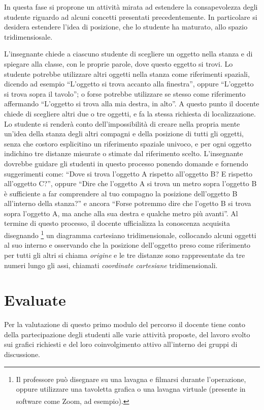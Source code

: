 \documentclass{report} \usepackage[T1]{fontenc} \usepackage[italian]{babel}
\begin{document}
In questa fase si proprone un attività mirata ad estendere la consapevolezza
degli studente riguardo ad alcuni concetti presentati precedentemente.
In particolare si desidera estendere l'idea di posizione, che lo studente ha maturato,
allo spazio tridimensiosale.

L'insegnante chiede a ciascuno studente di scegliere un oggetto nella stanza e di
spiegare alla classe, con le proprie parole, dove questo eggetto si trovi.
Lo studente potrebbe utilizzare altri oggetti nella stanza come riferimenti spaziali,
dicendo ad esempio ``L'oggetto si trova accanto alla finestra'', oppure
``L'oggetto si trova sopra il tavolo''; o forse potrebbe utilizzare se stesso come
riferimento affermando ``L'oggetto si trova alla mia destra, in alto''.
A questo punto il docente chiede di scegliere altri due o tre oggetti,
e fa la stessa richiesta di localizzazione. Lo studente si renderà
conto dell'impossibilità di creare nella propria mente un'idea della stanza
degli altri compagni e della posizione di tutti gli oggetti, senza che
costoro esplicitino un riferimento spaziale univoco, e per ogni oggetto indichino tre distanze
misurate o stimate dal riferimento scelto.
L'insegnante dovrebbe guidare gli studenti in questo processo ponendo domande e fornendo suggerimenti
come: ``Dove si trova l'oggetto A rispetto all'oggetto B? E rispetto all'oggetto C?'',
oppure ``Dire che l'oggetto A si trova un metro sopra l'oggetto B è sufficiente
a far comprendere al tuo compagno la posizione dell'oggetto B all'interno della stanza?''
e ancora ``Forse potremmo dire che l'ogetto B si trova sopra l'oggetto A, ma anche alla sua destra
e qualche metro più avanti''.
Al termine di questo processo, il docente ufficializza la conoscenza acquisita disegnando
\footnote{
Il professore può disegnare su una lavagna e filmarsi durante l'operazione, oppure
utilizzare una tavoletta grafica o una lavagna virtuale (presente in software
come Zoom\textsuperscript{\textregistered}, ad esempio).
}
un diagramma cartesiano tridimensionale, collocando alcuni oggetti al suo interno
e osservando che la posizione dell'oggetto preso come riferimento per tutti gli altri
si chiama \emph{origine} e le tre distanze sono rappresentate da tre numeri lungo
gli assi, chiamati \emph{coordinate cartesiane} tridimensionali.

\section{Evaluate}
Per la valutazione di questo primo modulo del percorso il docente tiene conto della
partecipazione degli studenti alle varie attività proposte, del lavoro svolto sui
grafici richiesti e del loro coinvolgimento attivo all’interno dei gruppi di discussione.
\end{document}
